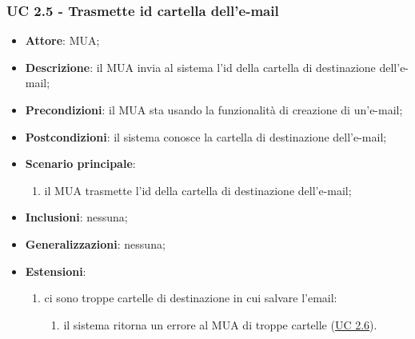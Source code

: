     \subsubsection{UC 2.5 - Trasmette id cartella dell'e-mail} \label{sec:UC2.5}
    \begin{itemize}
        \item \textbf{Attore}: MUA;
        \item \textbf{Descrizione}: il MUA invia al sistema l'id della cartella di destinazione dell'e-mail;
        \item \textbf{Precondizioni}: il MUA sta usando la funzionalità di creazione di un'e-mail;
        \item \textbf{Postcondizioni}: il sistema conosce la cartella di destinazione dell'e-mail;
        \item \textbf{Scenario principale}:
            \begin{enumerate}
                \item il MUA trasmette l'id della cartella di destinazione dell'e-mail;
            \end{enumerate}
        \item \textbf{Inclusioni}: nessuna;
        \item \textbf{Generalizzazioni}: nessuna;
        \item \textbf{Estensioni}:             
        \begin{enumerate}[label=\alph*.]
            \item ci sono troppe cartelle di destinazione in cui salvare l'email:
            \begin{enumerate}[label=\arabic*.]
                \item il sistema ritorna un errore al MUA di troppe cartelle (\hyperref[sec:UC2.6]{UC 2.6}).
            \end{enumerate}
        \end{enumerate}
    \end{itemize}

